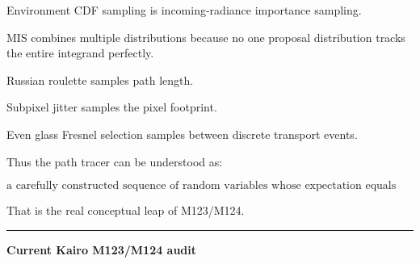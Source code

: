 Environment CDF sampling is incoming-radiance importance sampling.

MIS combines multiple distributions because no one proposal distribution tracks the entire integrand perfectly.

Russian roulette samples path length.

Subpixel jitter samples the pixel footprint.

Even glass Fresnel selection samples between discrete transport events.

Thus the path tracer can be understood as:

\[
\boxed{
\text{a carefully constructed sequence of random variables whose expectation equals the rendering equation.}
}
\]

That is the real conceptual leap of M123/M124.

\begin{center}\rule{0.5\linewidth}{0.5pt}\end{center}

\textbf{Current Kairo M123/M124 audit}


